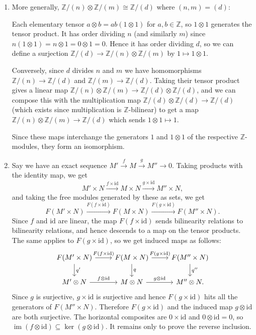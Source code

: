 \documentclass{report}
\newcommand{\id}{{\mathrm{id}}} %
\newcommand{\Z}{\mathbb{Z}}
\DeclareMathOperator{\im}{im}
\begin{document}
\begin{enumerate}[label=\textbf{1.3.\Alph*.}]
	\item More generally, $\Z/(n)\otimes\Z/(m)\cong\Z/(d)$ where $(n,m)=(d)$:

	      Each elementary tensor $a\otimes b=ab(1\otimes1)$ for $a,b\in\Z$,
	      so $1\otimes1$ generates the tensor product. It has order dividing
	      $n$ (and similarly $m$) since $n(1\otimes1)=n\otimes1=0\otimes1=0$.
	      Hence it has order dividing $d$, so we can define a surjection
	      $\Z/(d)\to\Z/(n)\otimes\Z/(m)$ by $1\mapsto1\otimes1$.

	      Conversely, since $d$ divides $n$ and $m$ we have homomorphisms
	      $\Z/(n)\to\Z/(d)$ and $\Z/(m)\to\Z/(d)$. Taking their tensor product
	      gives a linear map $\Z/(n)\otimes\Z/(m)\to\Z/(d)\otimes\Z/(d)$, and
	      we can compose this with the multiplication map
	      $\Z/(d)\otimes\Z/(d)\to\Z/(d)$ (which exists since multiplication is
	      $\Z$-bilinear) to get a map $\Z/(n)\otimes\Z/(m)\to\Z/(d)$ which
	      sends $1\otimes1\mapsto1$.

	      Since these maps interchange the generators $1$ and $1\otimes1$ of
	      the respective $\Z$-modules, they form an isomorphism.

	\item Say we have an exact sequence
	      $M'\xrightarrow{f}M\xrightarrow{g}M''\to0$. Taking products with the
	      identity map, we get
	      \begin{equation*}
		      M'\times N
		      \xrightarrow{f\times\id} M\times N
		      \xrightarrow{g\times\id} M''\times N,
	      \end{equation*}
	      and taking the free modules generated by these as sets, we get
	      \begin{equation*}
		      F(M'\times N)
		      \xrightarrow{F(f\times\id)} F(M\times N)
		      \xrightarrow{F(g\times\id)} F(M''\times N).
	      \end{equation*}
	      Since $f$ and $\id$ are linear, the map $F(f\times\id)$ sends
	      bilinearity relations to bilinearity relations, and hence descends
	      to a map on the tensor products. The same applies to $F(g\times\id)$,
	      so we get induced maps as follows:
	      \begin{equation*}
		      \begin{tikzcd}
			      F(M'\times N) \arrow{d}{q'}
			      \arrow{r}{F(f\times\id)} &F(M\times N) \arrow{d}{q}
			      \arrow{r}{F(g\times\id)} &F(M''\times N) \arrow{d}{q''} \\
			      M'\otimes N
			      \arrow{r}{f\otimes\id} &M\otimes N
			      \arrow{r}{g\otimes\id} &M''\otimes N.
		      \end{tikzcd}
	      \end{equation*}
	      Since $g$ is surjective, $g\times\id$ is surjective and hence
	      $F(g\times\id)$ hits all the generators of $F(M''\times N)$.
	      Therefore $F(g\times\id)$ and the induced map $g\otimes\id$ are both
	      surjective. The horizontal composites are $0\times\id$ and
	      $0\otimes\id=0$, so $\im(f\otimes\id)\subseteq\ker(g\otimes\id)$.
	      It remains only to prove the reverse inclusion.


\end{enumerate}
\end{document}
